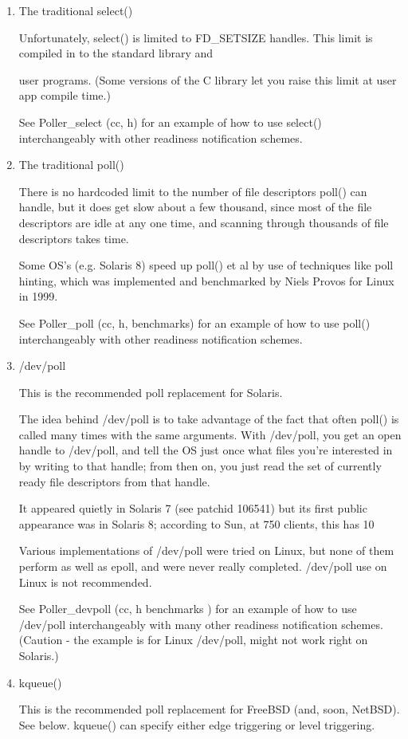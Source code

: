 \documentclass[twoside, xetex]{report}
\begin{document}
	\begin{enumerate}
	\item The traditional select() 
	
	Unfortunately, select() is limited to FD\_SETSIZE handles. This limit is compiled in to the standard library and 
	
	user programs. (Some versions of the C library let you raise this limit at user app compile time.)
	
	See Poller\_select (cc, h) for an example of how to use select() interchangeably with other readiness 
	notification schemes.

	\item  The traditional poll()
	 
	There is no hardcoded limit to the number of file descriptors poll() can handle, but it does get slow about a 
	few thousand, since most of the file descriptors are idle at any one time, and scanning through thousands of 
	file descriptors takes time.
	
	Some OS's (e.g. Solaris 8) speed up poll() et al by use of techniques like poll hinting, which was implemented 
	and benchmarked by Niels Provos for Linux in 1999.

	See Poller\_poll (cc, h, benchmarks) for an example of how to use poll() interchangeably with other readiness 
	notification schemes.

	\item /dev/poll
	
	This is the recommended poll replacement for Solaris.
	
	The idea behind /dev/poll is to take advantage of the fact that often poll() is called many times with the same 
	arguments. With /dev/poll, you get an open handle to /dev/poll, and tell the OS just once what files you're 
	interested in by writing to that handle; from then on, you just read the set of currently ready file
	descriptors from that handle.

	It appeared quietly in Solaris 7 (see patchid 106541) but its first public appearance was in Solaris 8; 	
	according to Sun, at 750 clients, this has 10%

	Various implementations of /dev/poll were tried on Linux, but none of them perform as well as epoll, and were 
	never really completed. /dev/poll use on Linux is not recommended.

	See Poller\_devpoll (cc, h benchmarks ) for an example of how to use /dev/poll interchangeably with many other 
	readiness notification schemes. (Caution - the example is for Linux /dev/poll, might not work right on Solaris.)

	\item kqueue()
	
	This is the recommended poll replacement for FreeBSD (and, soon, NetBSD).
	See below. kqueue() can specify either edge triggering or level triggering.
	
	\end{enumerate}
\end{document}
